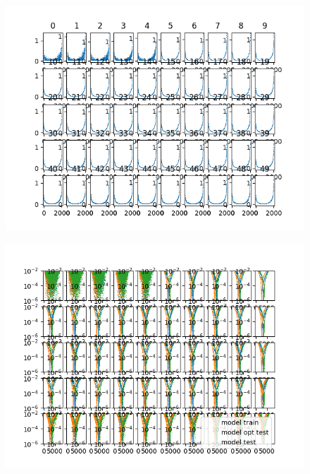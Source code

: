 \documentclass{article}
\begin{document}
\begin{figure}
\includegraphics[scale=1]{error_par_feature.png}
\end{figure}

\newpage

\begin{figure}
\includegraphics[scale=1]{error_par_feature_test.png}
\end{figure}

\newpage
\end{document}
